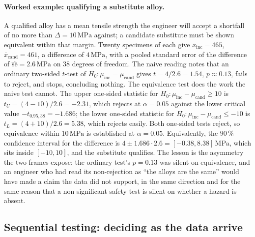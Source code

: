 \paragraph{Worked example: qualifying a substitute alloy.} A qualified
alloy has a mean tensile strength the engineer will accept a shortfall
of no more than $\Delta = 10\,\si{\mega\pascal}$ against; a candidate
substitute must be shown equivalent within that margin. Twenty
specimens of each give $\bar{x}_{\text{inc}} = 465$, $\bar{x}_{\text{cand}}
= 461$, a difference of $4\,\si{\mega\pascal}$, with a pooled standard
error of the difference of $\widehat{\mathrm{se}} = 2.6\,
\si{\mega\pascal}$ on $38$ degrees of freedom. The naive reading notes
that an ordinary two-sided $t$-test of $H_{0}: \mu_{\text{inc}} =
\mu_{\text{cand}}$ gives $t = 4/2.6 = 1.54$, $p \approx 0.13$, fails to
reject, and stops, concluding nothing. The equivalence test does the
work the naive test cannot. The upper one-sided statistic for
$H_{0}: \mu_{\text{inc}} - \mu_{\text{cand}} \geq 10$ is $t_{U} = (4 -
10)/2.6 = -2.31$, which rejects at $\alpha = 0.05$ against the lower
critical value $-t_{0.95, 38} = -1.686$; the lower one-sided statistic
for $H_{0}: \mu_{\text{inc}} - \mu_{\text{cand}} \leq -10$ is $t_{L} =
(4 + 10)/2.6 = 5.38$, which rejects easily. Both one-sided tests
reject, so equivalence within $10\,\si{\mega\pascal}$ is established at
$\alpha = 0.05$. Equivalently, the $90\,\%$ confidence interval for the
difference is $4 \pm 1.686 \cdot 2.6 = [-0.38, 8.38]\,\si{\mega\pascal}$,
which sits inside $[-10, 10]$, and the substitute qualifies. The
lesson is the asymmetry the two frames expose: the ordinary test's
$p = 0.13$ was silent on equivalence, and an engineer who had read
its non-rejection as ``the alloys are the same'' would have made a
claim the data did not support, in the same direction and for the same
reason that a non-significant safety test is silent on whether a
hazard is absent.

\subsection{Sequential testing: deciding as the data arrive}

